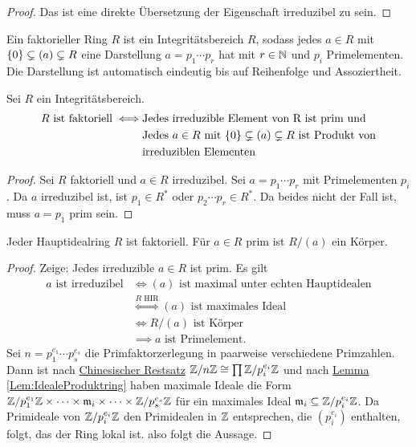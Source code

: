\begin{proof}
    Das ist eine direkte Übersetzung der Eigenschaft irreduzibel zu sein.
\end{proof}
\begin{Def}
    Ein faktorieller Ring $R$ ist ein Integritätsbereich $R$, sodass jedes $a\in R$ mit $\{0\}\subsetneq (a)\subsetneq R$ eine Darstellung $a=p_1\cdots p_r$ hat mit $r\in\mathbb{N}$ und $p_i$ Primelementen. Die Darstellung ist automatisch eindeutig bis auf Reihenfolge und Assoziertheit.
\end{Def}
\begin{Lemma}
    Sei $R$ ein Integritätsbereich. 
    \begin{align*}
        R \text{ ist faktoriell} \iff& \text{Jedes irreduzible Element von R ist prim und}\\
        & \text{Jedes $a\in R$ mit $\{0\}\subsetneq (a)\subsetneq R$ ist Produkt von}\\
        &\text{irreduziblen Elementen}
    \end{align*}
\end{Lemma}
\begin{proof}
    Sei $R$ faktoriell und $a\in R$ irreduzibel. Sei $a=p_1\cdots p_r$ mit Primelementen $p_i$. Da $a$ irreduzibel ist, ist $p_1\in R^*$ oder $p_2\cdots p_r\in R^*$. Da beides nicht der Fall ist, muss $a=p_1$ prim sein.
\end{proof}
\begin{Satz}
    Jeder Hauptidealring $R$ ist faktoriell. Für $a\in R$ prim ist $R/(a)$ ein Körper.
\end{Satz}
\begin{proof}
    Zeige: Jedes irreduzible $a\in R$ ist prim. Es gilt 
    \begin{align*}
        a \text{ ist irreduzibel} &\iff (a) \text{ ist maximal unter echten Hauptidealen}\\
        &\stackrel{R \text{ HIR}}\iff (a) \text{ ist maximales Ideal}\\
        &\iff R/(a) \text{ ist Körper}\\
        &\implies a \text{ ist Primelement.}
    \end{align*}
    Sei $n=p_1^{e_1}\cdots p_s^{e_s}$ die Primfaktorzerlegung in paarweise verschiedene Primzahlen. Dann ist nach \hyperref[Lem:ChinRest1]{Chinesischer Restsatz} $\mathbb{Z}/n\mathbb{Z}\cong \prod \mathbb{Z}/p_i^{e_i}\mathbb{Z}$ und nach \hyperref[Lem:IdealeProduktring]{Lemma \ref{Lem:IdealeProduktring}} haben maximale Ideale die Form $\mathbb{Z}/p_1^{e_1}\mathbb{Z}\times\dots\times \mathfrak{m}_i\times\dots\times \mathbb{Z}/p_s^{e_s}\mathbb{Z}$ für ein maximales Ideal $\mathfrak{m}_i \subseteq \mathbb{Z}/p_i^{e_i}\mathbb{Z}$.
    Da Primideale von $\mathbb{Z}/p_i^{e_i}\mathbb{Z}$ den Primidealen in $\mathbb{Z}$ entsprechen, die $(p_i^{e_i})$ enthalten, folgt, das der Ring lokal ist. also folgt die Aussage.
\end{proof}


